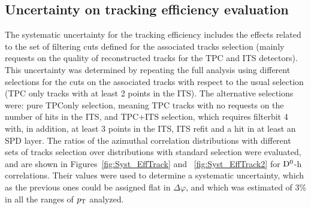 \subsection{Uncertainty on tracking efficiency evaluation}
The systematic uncertainty for the tracking efficiency includes the effects related to the set of filtering cuts defined for the associated tracks selection (mainly requests on the quality of reconstructed tracks for the TPC and ITS detectors). This uncertainty was determined by repeating the full analysis using different selections for the cuts on the associated tracks with respect to the usual selection (TPC only tracks with at least 2 points in the ITS). The alternative selections were: pure TPConly selection, meaning TPC tracks with no requests on the number of hits in the ITS, and TPC+ITS selection, which requires filterbit 4 with, in addition, at least 3 points in the ITS, ITS refit and a hit in at least an SPD layer. The ratios of the azimuthal correlation distributions with different sets of tracks selection over distributions with standard selection were evaluated, and are shown in Figures~\ref{fig:Syst_EffTrack} and ~\ref{fig:Syst_EffTrack2} for ${\rm D^0}$-h correlations. Their values were used to determine a systematic uncertainty, which as the previous ones could be assigned flat in $\Delta\varphi$, and which was estimated of 3\% in all the ranges of $p_{\rm T}$ analyzed.

